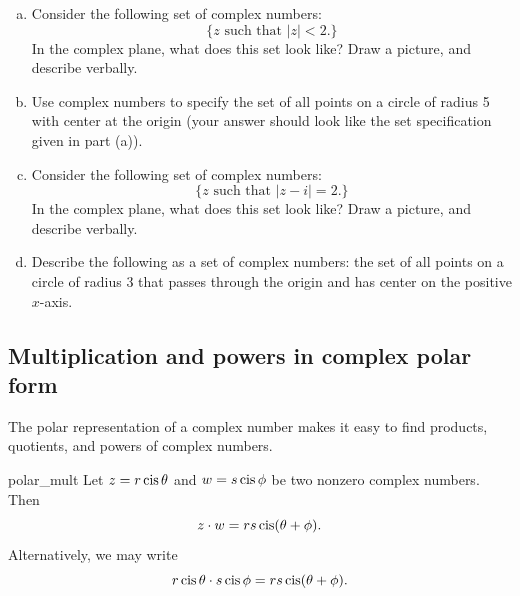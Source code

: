 \begin{exercise}{23}
\begin{enumerate}[(a)]
\item
Consider the following set of complex numbers:
\[ \{z \text{ such that } |z| < 2. \} \]
In the complex plane, what does this set look like? Draw a picture, and describe verbally.
\item
Use complex numbers to specify the set of all points on a circle of radius 5 with center at the origin (your answer should look like the set specification given in part (a)).
\item
Consider the following set of complex numbers:
\[ \{z \text{ such that } |z-i| = 2. \} \]
In the complex plane, what does this set look like? Draw a picture, and describe verbally.
\item
Describe the following as a set of complex numbers:  the set of all points on a circle of radius 3 that passes through the origin and has center on the positive $x$-axis.
\end{enumerate}
\end{exercise}

\subsection{Multiplication and powers in complex polar form}

The polar representation of a complex number makes it easy to find
products, quotients, and powers of complex numbers. 

\begin{prop}{polar_mult} Let $z=r\operatorname{cis}\theta$ and $w=s\operatorname{cis}\phi$
be two nonzero complex numbers. Then 
\[z \cdot w=rs\operatorname{cis}(\theta+\phi).\]
Alternatively, we may write
\[r \operatorname{cis} \theta \cdot s \operatorname{cis} \phi =rs\operatorname{cis}(\theta+\phi).\]
 \end{prop}

